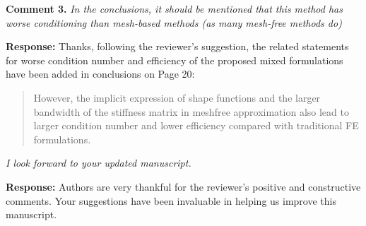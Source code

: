 \documentclass{article}
\begin{document}
\textbf{Comment 3.} \textit{In the conclusions, it should be mentioned that this method has worse conditioning than mesh-based methods (as many mesh-free methods do)}

\textbf{Response:}
Thanks, following the reviewer's suggestion,
the related statements for worse condition number and efficiency of the proposed mixed formulations have been added in conclusions on Page 20:
\begin{quote}
However, the implicit expression of shape functions and the larger bandwidth of the stiffness matrix in meshfree approximation also lead to larger condition number and lower efficiency compared with traditional FE formulations.
\end{quote} 

\textit{I look forward to your updated manuscript.}

\textbf{Response:} 
Authors are very thankful for the reviewer's positive and constructive comments.
Your suggestions have been invaluable in helping us improve this manuscript.

% 
\end{document}
